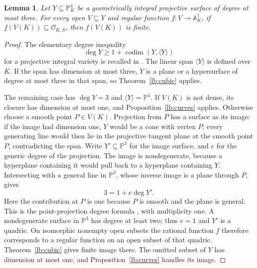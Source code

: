 \documentclass[11pt,a4paper]{article}
\newtheorem{lemma}[theorem]{Lemma}
\theoremstyle{definition}
\newcommand{\OKS}{\mathcal O_{K,S}}
\newcommand{\A}{\mathbb A}
\newcommand{\PP}{\mathbb P}
\begin{document}
\begin{lemma}\label{lb:small-degree-surface}
Let $Y\subseteq\PP^4_K$ be a geometrically integral projective
surface of degree at most three. For every open $V\subseteq Y$ and regular
function $f:V\to\A^1_K$, if $f(V(K))\subseteq\OKS$, then
$f(V(K))$ is finite.
\end{lemma}
\begin{proof}
The elementary degree inequality
\[
 \deg Y\ge 1+\operatorname{codim}(Y,\langle Y\rangle)
\]
for a projective integral variety is recalled in
\cite[Introduction, inequality $(*)$]{EGHP}. The linear span
$\langle Y\rangle$ is defined over $K$. If the span has dimension
at most three, $Y$ is a plane or a hypersurface of degree at most
three in that span, so Theorem~\ref{lb:cubic} applies.

The remaining case has $\deg Y=3$ and $\langle Y\rangle=\PP^4$.
If $V(K)$ is not dense, its closure has dimension at most one,
and Proposition~\ref{lb:curves} applies. Otherwise choose a smooth
point $P\in V(K)$. Projection from $P$ has a surface as its image:
if the image had dimension one, $Y$ would be a cone with vertex
$P$; every generating line would then lie in the projective
tangent plane at the smooth point $P$, contradicting the span.
Write $Y'\subseteq\PP^3$ for the image surface, and $e$ for the
generic degree of the projection. The image is nondegenerate,
because a hyperplane containing it would pull back to a
hyperplane containing $Y$. Intersecting with a general line in
$\PP^3$, whose inverse image is a plane through $P$, gives
\[
                         3=1+e\deg Y'.
\]
Here the contribution at $P$ is one because $P$ is smooth and
the plane is general. This is the point-projection degree
formula \cite[Theorem~5.11]{Mumford}, with multiplicity one.
A nondegenerate surface in $\PP^3$ has
degree at least two; thus $e=1$ and $Y'$ is a quadric.
On isomorphic nonempty open subsets the rational function $f$
therefore corresponds to a regular function on an open subset
of that quadric. Theorem~\ref{lb:cubic} gives finite image there.
The omitted subset of $Y$ has dimension at most one, and
Proposition~\ref{lb:curves} handles its image.
\end{proof}
\end{document}
